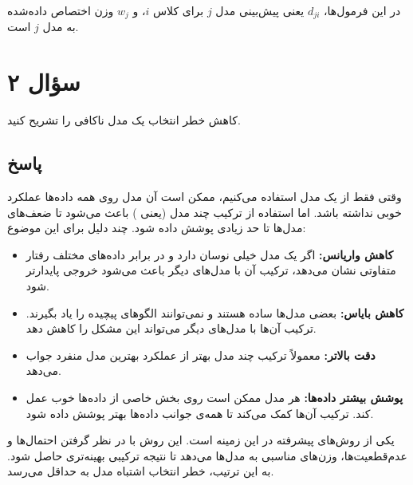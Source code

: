 \documentclass[12pt]{article}
\begin{document}
	در این فرمول‌ها، \( d_{ji} \) یعنی پیش‌بینی مدل \( j \) برای کلاس \( i \)، و \( w_j \) وزن اختصاص داده‌شده به مدل \( j \) است.
	
	\vspace{1em}
	
	\section*{سؤال ۲}
	کاهش خطر انتخاب یک مدل ناکافی را تشریح کنید.
	
	\subsection*{پاسخ}
	وقتی فقط از یک مدل استفاده می‌کنیم، ممکن است آن مدل روی همه داده‌ها عملکرد خوبی نداشته باشد. اما استفاده از ترکیب چند مدل (یعنی ) باعث می‌شود تا ضعف‌های مدل‌ها تا حد زیادی پوشش داده شود. چند دلیل برای این موضوع:
	
	\begin{itemize}
		\item \textbf{کاهش واریانس:} اگر یک مدل خیلی نوسان دارد و در برابر داده‌های مختلف رفتار متفاوتی نشان می‌دهد، ترکیب آن با مدل‌های دیگر باعث می‌شود خروجی پایدارتر شود.
		
		\item \textbf{کاهش بایاس:} بعضی مدل‌ها ساده هستند و نمی‌توانند الگوهای پیچیده را یاد بگیرند. ترکیب آن‌ها با مدل‌های دیگر می‌تواند این مشکل را کاهش دهد.
		
		\item \textbf{دقت بالاتر:} معمولاً ترکیب چند مدل بهتر از عملکرد بهترین مدل منفرد جواب می‌دهد.
		
		\item \textbf{پوشش بیشتر داده‌ها:} هر مدل ممکن است روی بخش خاصی از داده‌ها خوب عمل کند. ترکیب آن‌ها کمک می‌کند تا همه‌ی جوانب داده‌ها بهتر پوشش داده شود.
	\end{itemize}
	
	یکی از روش‌های پیشرفته در این زمینه  است. این روش با در نظر گرفتن احتمال‌ها و عدم‌قطعیت‌ها، وزن‌های مناسبی به مدل‌ها می‌دهد تا نتیجه ترکیبی بهینه‌تری حاصل شود. به این ترتیب، خطر انتخاب اشتباه مدل به حداقل می‌رسد.
	
\end{document}

